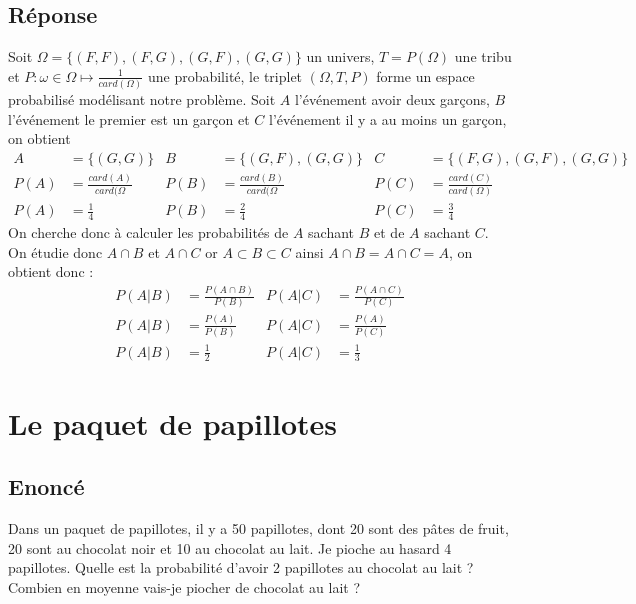 \documentclass[10pt,a4paper,twoside]{article}
\begin{document}
\subsection*{Réponse}
Soit $\Omega = \{(F,F),(F,G),(G,F),(G,G)\}$ un univers, $T=P(\Omega)$ une tribu et $P:\omega \in\Omega \mapsto \frac{1}{card(\Omega)}$ une probabilité, le triplet $(\Omega,T,P)$ forme un espace probabilisé modélisant notre problème. Soit $A$ l'événement avoir deux garçons, $B$ l'événement le premier est un garçon et $C$ l'événement il y a au moins un garçon, on obtient 
\begin{align*}
A & =\{(G,G)\} & B &=\{(G,F),(G,G)\} & C &=\{(F,G),(G,F),(G,G)\}\\
P(A) &=\frac{card(A)}{card(\Omega} & P(B) &=\frac{card(B)}{card(\Omega} & P(C) &=\frac{card(C)}{card(\Omega)}\\
P(A) &=\frac{1}{4} & P(B) &=\frac{2}{4} & P(C) &=\frac{3}{4}
\end{align*}
On cherche donc à calculer les probabilités de $A$ sachant $B$ et de $A$ sachant $C$. On étudie donc $A\cap B$ et $A\cap C$ or $A\subset B\subset C$ ainsi $A\cap B = A\cap C = A$, on obtient donc :
\begin{align*}
P(A|B) &= \frac{P(A\cap B)}{P(B)} & P(A|C) &= \frac{P(A\cap C)}{P(C)}\\
P(A|B) &= \frac{P(A)}{P(B)} & P(A|C) &= \frac{P(A)}{P(C)}\\
P(A|B) &= \frac{1}{2} & P(A|C) &= \frac{1}{3}
\end{align*}

\section{Le paquet de papillotes}
\subsection*{Enoncé}
Dans un paquet de papillotes, il y a 50 papillotes, dont 20 sont des pâtes de fruit, 20 sont au chocolat noir et 10 au chocolat au lait. Je pioche au hasard 4 papillotes. Quelle est la probabilité d'avoir 2 papillotes au chocolat au lait ? Combien en moyenne vais-je piocher de chocolat au lait ?
\end{document}
